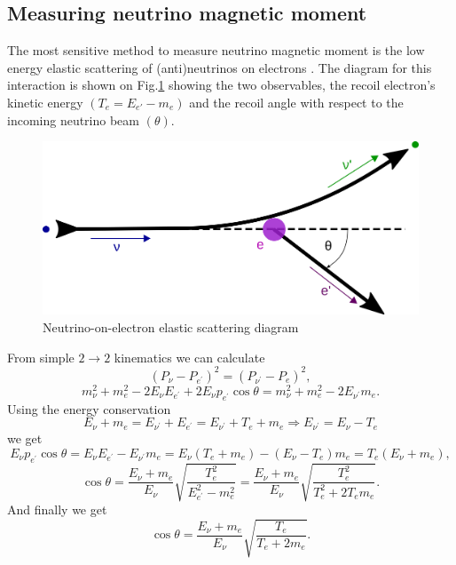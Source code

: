 
\subsection{Measuring neutrino magnetic moment}\label{sec:MeasuringNuMM}
The most sensitive method to measure neutrino magnetic moment is the low energy elastic scattering of (anti)neutrinos on electrons \cite{nuElmagInt2015.pdf}. The diagram for this interaction is shown on Fig.\ref{fig:NuoneDiagram} showing the two observables, the recoil electron's kinetic energy $\left(T_e=E_{e\prime}-m_e\right)$ and the recoil angle with respect to the incoming neutrino beam $\left(\theta\right)$.
\begin{figure}[hbtp]
\centering
\includegraphics[width=0.55\linewidth]{Plots/NuMM/NuoneInteraction.png}
\caption{Neutrino-on-electron elastic scattering diagram}
\label{fig:NuoneDiagram}
\end{figure}

From simple $2\rightarrow 2$ kinematics we can calculate
\begin{equation}
\left(P_{\nu}-P_{e^{\prime}}\right)^2=\left(P_{\nu^{\prime}}-P_e\right)^2,
\end{equation}
\begin{equation}
m_{\nu}^2+m_e^2-2E_{\nu}E_{e^{\prime}}+2E_{\nu}p_{e^{\prime}}\cos\theta=m_{\nu}^2+m_e^2-2E_{\nu^{\prime}}m_e.
\end{equation}
Using the energy conservation
\begin{equation}
E_{\nu}+m_e=E_{\nu^{\prime}}+E_{e^{\prime}}=E_{\nu^{\prime}}+T_e+m_e\Rightarrow E_{\nu^{\prime}}=E_{\nu}-T_e
\end{equation}
we get
\begin{equation}
E_{\nu}p_{e^{\prime}}\cos\theta=E_{\nu}E_{e^{\prime}}-E_{\nu^{\prime}}m_e=E_{\nu}\left(T_e+m_e\right)-\left(E_{\nu}-T_e\right)m_e=T_e\left(E_{\nu}+m_e\right),
\end{equation}
\begin{equation}
\cos\theta=\frac{E_{\nu}+m_e}{E_{\nu}}\sqrt{\frac{T_e^2}{E_{e^{\prime}}^2-m_e^2}}=\frac{E_{\nu}+m_e}{E_{\nu}}\sqrt{\frac{T_e^2}{T_e^2+2T_em_e}}.
\end{equation}
And finally we get
\begin{equation}\label{eq:ThetaTRelation}
\cos\theta=\frac{E_{\nu}+m_e}{E_{\nu}}\sqrt{\frac{T_e}{T_e+2m_e}}.
\end{equation}


